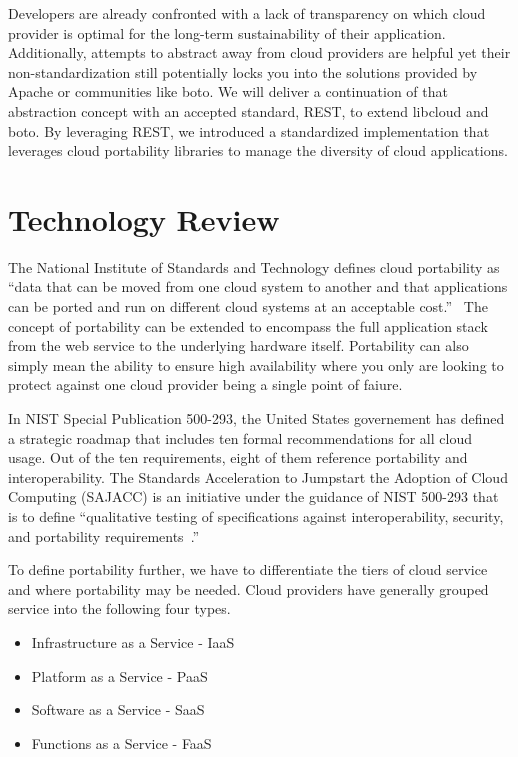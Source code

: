 Developers are already confronted with a lack of transparency on which cloud
provider is optimal for the long-term sustainability of their application.
Additionally, attempts to abstract away from cloud providers are helpful yet
their non-standardization still potentially locks you into the solutions
provided by Apache or communities like boto. We will deliver a continuation of
that abstraction concept with an accepted standard, REST, to extend libcloud
and
boto. By leveraging REST, we introduced a standardized implementation
that leverages cloud portability libraries to manage the diversity of cloud
applications. 

\section{Technology Review}

The National Institute of Standards and Technology defines cloud  portability
as
``data that can be moved from one cloud system to another and that 
applications
can be ported and run on different  cloud systems at an  acceptable
cost.''~\cite{hid-sp18-518-NIST-291} The concept of portability can be extended
to encompass the full application stack from the web service to the underlying
hardware itself. Portability can also simply mean the ability to ensure high
availability where you only are looking to protect against one cloud provider
being a single point of faiure.

In NIST Special Publication 500-293, the United States governement has defined
a
strategic roadmap that includes ten formal recommendations for all cloud usage.
Out of the ten requirements, eight of them reference portability and
interoperability. The Standards Acceleration to Jumpstart the Adoption of Cloud
Computing (SAJACC) is an initiative under the guidance of NIST 500-293 that is
to define ``qualitative testing of specifications against interoperability,
security, and portability requirements~\cite{hid-sp18-518-NIST-293}.''

To define portability further, we have to differentiate the tiers of cloud
service and where portability may be needed. Cloud providers have generally
grouped service into the following four types.

\begin{itemize}
\item
  Infrastructure as a Service - IaaS
\item
  Platform as a Service - PaaS
\item
  Software as a Service - SaaS
\item
  Functions as a Service - FaaS
\end{itemize}

